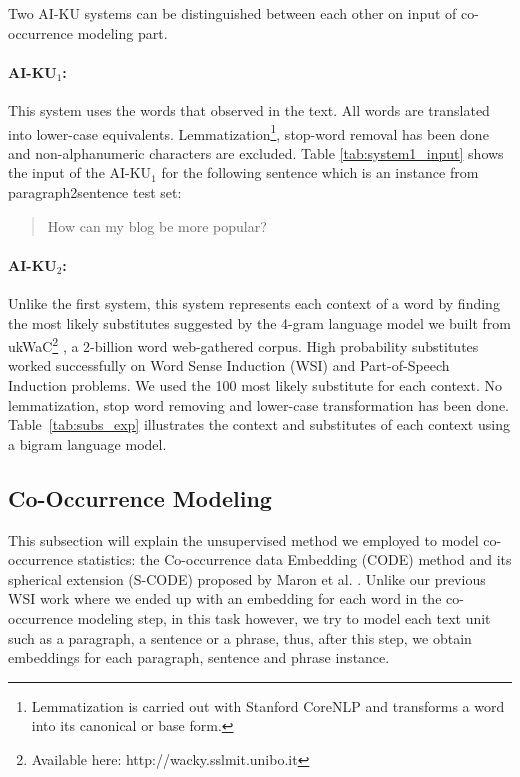 \documentclass[11pt]{article}
\begin{document}
Two AI-KU systems can be distinguished between each other on input of co-occurrence modeling part. 

\paragraph{AI-KU$_1$:} This system uses the words that observed in the text. All words are translated into lower-case equivalents. Lemmatization\footnote{Lemmatization is carried out with Stanford CoreNLP and transforms a word into its canonical or base form.}, stop-word removal has been done and non-alphanumeric characters are excluded. Table \ref{tab:system1_input} shows the input of the AI-KU$_1$ for the following sentence which is an instance from paragraph2sentence test set:

\begin{quote}
How can my blog be more popular?
\end{quote}



\paragraph{AI-KU$_2$:} Unlike the first system, this system represents each context of a word by finding the most likely substitutes suggested by the 4-gram language model we built from ukWaC\footnote{Available here: http://wacky.sslmit.unibo.it} \cite{ukWaC}, a 2-billion word web-gathered corpus. High probability substitutes worked successfully on Word Sense Induction (WSI) \cite{baskaya13ai} and Part-of-Speech Induction \cite{yatbaz2012learning} problems. We used the 100 most likely substitute for each context. No lemmatization, stop word removing and lower-case transformation has been done. Table~\ref{tab:subs_exp} illustrates the context and substitutes of each context using a bigram language model.



\subsection{Co-Occurrence Modeling}

This subsection will explain the unsupervised method we employed to model co-occurrence statistics: the Co-occurrence data Embedding (CODE) method \cite{globerson-CODE} and its spherical extension (S-CODE) proposed by Maron et al. . Unlike our previous WSI work \cite{baskaya13ai} where we ended up with an embedding for each
word in the co-occurrence modeling step, in this task however, we try to model each text unit such as a paragraph, a sentence or a phrase, thus, after this step, we obtain embeddings for each paragraph, sentence and phrase instance. 
\end{document}
